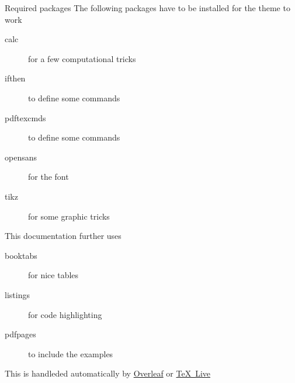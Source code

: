 \documentclass[aspectratio=169]{beamer}
\begin{document}
		\begin{frame}{Required packages}
			The following packages have to be installed for the theme to work
			\begin{description}
				\item[calc] for a few computational tricks
				\item[ifthen] to define some commands
				\item[pdftexcmds] to define some commands
				\item[opensans] for the font
				\item[tikz] for some graphic tricks
			\end{description}
			This documentation further uses
			\begin{description}
				\item[booktabs] for nice tables
				\item[listings] for code highlighting
				\item[pdfpages] to include the examples
			\end{description}
			This is handleded automatically by \href{https://overleaf.com}{Overleaf} or \href{https://www.tug.org/texlive/}{TeX~Live}
		\end{frame}
\end{document}
